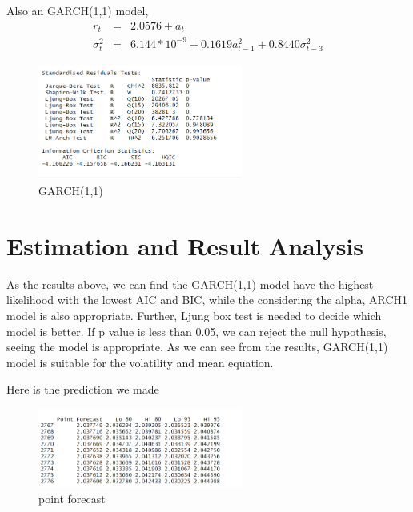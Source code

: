 \documentclass[12pt, a4paper, titlepage]{article}
\begin{document}
Also an GARCH(1,1) model,
\begin{eqnarray*}
r_t &=& 2.0576 + a_t\\
\sigma_t^2 &=& 6.144*10^{-9} + 0.1619 a_{t-1}^2 + 0.8440 \sigma_{t-3}^2
\end{eqnarray*}
\begin{figure}[h!]
\begin{center}
\caption{GARCH(1,1)}\label{GARCH(1,1)}
\includegraphics[width=0.6\textwidth]{garch11a.png} 
\end{center}
\end{figure}

\section{Estimation and Result Analysis}
As the results above, we can find the GARCH(1,1) model have the highest likelihood with the lowest AIC and BIC, while the considering the alpha, ARCH1 model is also appropriate. Further, Ljung box test is needed to decide which model is better. If p value is less than 0.05, we can reject the null hypothesis, seeing the model is appropriate. As we can see from the results, GARCH(1,1) model is suitable for the volatility and mean equation.

Here is the prediction we made
\begin{figure}[h!]
\begin{center}
\caption{point forecast}\label{pre}
\includegraphics[width=0.6\textwidth]{pre.png}
\end{center}
\end{figure}
\end{document}
